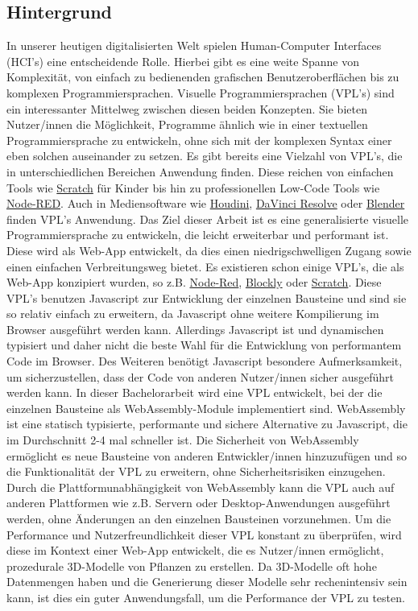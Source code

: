 \documentclass[ngerman]{article}
\begin{document}
\subsection{Hintergrund}
In unserer heutigen digitalisierten Welt spielen Human-Computer Interfaces (HCI's) eine entscheidende Rolle.
Hierbei gibt es eine weite Spanne von Komplexität, von einfach zu bedienenden grafischen Benutzeroberflächen bis zu komplexen Programmiersprachen. 
\br
Visuelle Programmiersprachen (VPL's) sind ein interessanter Mittelweg zwischen diesen beiden Konzepten. Sie bieten Nutzer/innen die Möglichkeit, Programme ähnlich wie in einer textuellen Programmiersprache zu entwickeln, ohne sich mit der komplexen Syntax einer eben solchen auseinander zu setzen.
\br
Es gibt bereits eine Vielzahl von VPL's, die in unterschiedlichen Bereichen Anwendung finden.
Diese reichen von einfachen Tools wie \href{https://scratch.mit.edu/}{Scratch} für Kinder bis hin zu professionellen Low-Code Tools wie \href{https://nodered.org/}{Node-RED}. Auch in Mediensoftware wie \href{https://www.sidefx.com/products/houdini/}{Houdini}, \href{https://www.blackmagicdesign.com/de/products/davinciresolve/}{DaVinci Resolve} oder \href{https://www.blender.org/}{Blender} finden VPL's Anwendung.
\br
Das Ziel dieser Arbeit ist es eine generalisierte visuelle Programmiersprache zu entwickeln, die leicht erweiterbar und performant ist.
Diese wird als Web-App entwickelt, da dies einen niedrigschwelligen Zugang sowie einen einfachen Verbreitungsweg bietet.
\br
Es existieren schon einige VPL's, die als Web-App konzipiert wurden, so z.B. \href{https://nodered.org}{Node-Red},
\href{https://developers.google.com/blockly}{Blockly} oder \href{https://scratch.mit.edu/}{Scratch}. Diese VPL's benutzen Javascript zur Entwicklung der einzelnen Bausteine und sind sie so relativ einfach zu erweitern, da Javascript ohne weitere Kompilierung im Browser ausgeführt werden kann. 
Allerdings Javascript ist  und dynamischen typisiert und daher nicht die beste Wahl für die Entwicklung von performantem Code im Browser. Des Weiteren benötigt Javascript besondere Aufmerksamkeit, um sicherzustellen, dass der Code von anderen Nutzer/innen sicher ausgeführt werden kann. 
\br
In dieser Bachelorarbeit wird eine VPL entwickelt, bei der die einzelnen Bausteine als WebAssembly-Module implementiert sind. 
WebAssembly ist eine statisch typisierte, performante und sichere Alternative zu Javascript, die im Durchschnitt 2-4 mal schneller ist. \cite{electronics11193217} \cite{Haas2017} Die Sicherheit von WebAssembly ermöglicht es neue Bausteine von anderen Entwickler/innen hinzuzufügen und so die Funktionalität der VPL zu erweitern, ohne Sicherheitsrisiken einzugehen. Durch die Plattformunabhängigkeit von WebAssembly kann die VPL auch auf anderen Plattformen wie z.B. Servern oder Desktop-Anwendungen ausgeführt werden, ohne Änderungen an den einzelnen Bausteinen vorzunehmen.
\br
Um die Performance und Nutzerfreundlichkeit dieser VPL konstant zu überprüfen, wird diese im Kontext einer Web-App entwickelt, die es Nutzer/innen ermöglicht, prozedurale 3D-Modelle von Pflanzen zu erstellen. 
Da 3D-Modelle oft hohe Datenmengen haben und die Generierung dieser Modelle sehr rechenintensiv sein kann, ist dies ein guter Anwendungsfall, um die Performance der VPL zu testen.
\end{document}
